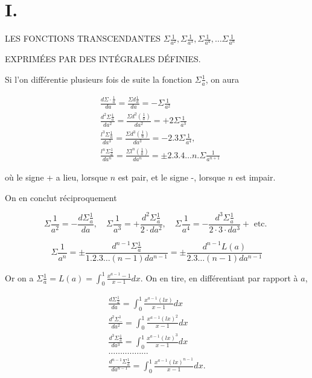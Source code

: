 \documentclass{article}
\begin{document}
\section*{I.}

LES FONCTIONS TRANSCENDANTES \(\Sigma \frac{1}{a^{2}}, \Sigma \frac{1}{a^{3}}, \Sigma \frac{1}{a^{4}}, \ldots \Sigma \frac{1}{a^{n}}\)

EXPRIMÉES PAR DES INTÉGRALES DÉFINIES.

Si l'on différentie plusieurs fois de suite la fonction \(\Sigma \frac{1}{a}\), on aura

\[
\begin{aligned}
& \frac{d \Sigma \cdot \frac{1}{a}}{d a}=\frac{\Sigma d \frac{1}{a}}{d a}=-\Sigma \frac{1}{a^{2}} \\
& \frac{d^{2} \Sigma \frac{1}{a}}{d a^{2}}=\frac{\Sigma d^{2}\left(\frac{1}{a}\right)}{d a^{2}}=+2 \Sigma \frac{1}{a^{3}} \\
& \frac{l^{3} \Sigma \frac{1}{a}}{d a^{3}}=\frac{\Sigma d^{3}\left(\frac{1}{a}\right)}{d a^{3}}=-2.3 \Sigma \frac{1}{a^{4}}, \\
& \frac{l^{n} \Sigma \frac{1}{a}}{d a^{n}}=\frac{\Sigma l^{n}\left(\frac{1}{a}\right)}{d a^{n}}= \pm 2.3 .4 \ldots n . \Sigma \frac{1}{a^{n+1}}
\end{aligned}
\]

où le signe + a lieu, lorsque \(n\) est pair, et le signe -, lorsque \(n\) est impair.

On en conclut réciproquement

\[
\Sigma \frac{1}{a^{2}}=-\frac{d \Sigma \frac{1}{a}}{d a}, \quad \Sigma \frac{1}{a^{3}}=+\frac{d^{2} \Sigma \frac{1}{a}}{2 \cdot d a^{2}}, \quad \Sigma \frac{1}{a^{4}}=-\frac{d^{3} \Sigma \frac{1}{a}}{2 \cdot 3 \cdot d a^{3}}+\text { etc. }
\]

\[
\Sigma \frac{1}{a^{n}}= \pm \frac{d^{n-1} \Sigma \frac{1}{a}}{1.2 .3 \ldots(n-1) d a^{n-1}}= \pm \frac{d^{n-1} L(a)}{2.3 \ldots(n-1) d a^{n-1}}
\]

Or on a \(\Sigma \frac{1}{a}=L(a)=\int_{0}^{1} \frac{x^{a-1}-1}{x-1} d x\). On en tire, en différentiant par rapport à \(a\),

\[
\begin{gathered}
\frac{d \Sigma \frac{1}{a}}{d a}=\int_{0}^{1} \frac{x^{a-1}(l x)}{x-1} d x \\
\frac{d^{2} \Sigma_{-}^{1}}{d a^{2}}=\int_{0}^{1} \frac{x^{a-1}(l x)^{2}}{x-1} d x \\
\frac{d^{3} \Sigma \frac{1}{a}}{d a^{3}}=\int_{0}^{1} \frac{x^{a-1}(l x)^{3}}{x-1} d x \\
\ldots \ldots \ldots . \ldots . \ldots \\
\frac{d^{n-1} \Sigma \frac{1}{a}}{d a^{n-1}}=\int_{0}^{1} \frac{x^{a-1}(l x)^{n-1}}{x-1} d x .
\end{gathered}
\]
\end{document}
